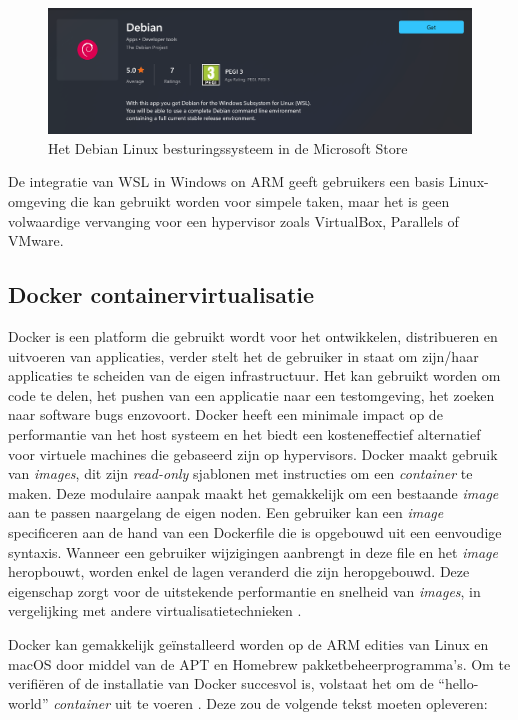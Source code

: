 \begin{figure}[!h]
	\centering
	\includegraphics[width=\linewidth]{img/debian.png}
	\caption{Het Debian Linux besturingssysteem in de Microsoft Store}
\end{figure}

De integratie van WSL in Windows on ARM geeft gebruikers een basis Linux-omgeving die kan gebruikt worden voor simpele taken, maar het is geen volwaardige vervanging voor een hypervisor zoals VirtualBox, Parallels of VMware.

\subsection{Docker containervirtualisatie}
Docker is een platform die gebruikt wordt voor het ontwikkelen, distribueren en uitvoeren van applicaties, verder stelt het de gebruiker in staat om zijn/haar applicaties te scheiden van de eigen infrastructuur. Het kan gebruikt worden om code te delen, het pushen van een applicatie naar een testomgeving, het zoeken naar software bugs enzovoort. Docker heeft een minimale impact op de performantie van het host systeem en het biedt een kosteneffectief alternatief voor virtuele machines die gebaseerd zijn op hypervisors. Docker maakt gebruik van \textit{images}, dit zijn \textit{read-only} sjablonen met instructies om een \textit{container} te maken. Deze modulaire aanpak maakt het gemakkelijk om een bestaande \textit{image} aan te passen naargelang de eigen noden. Een gebruiker kan een \textit{image} specificeren aan de hand van een Dockerfile die is opgebouwd uit een eenvoudige syntaxis. Wanneer een gebruiker wijzigingen aanbrengt in deze file en het \textit{image} heropbouwt, worden enkel de lagen veranderd die zijn heropgebouwd. Deze eigenschap zorgt voor de uitstekende performantie en snelheid van \textit{images}, in vergelijking met andere virtualisatietechnieken \autocite{Docker2020}.

Docker kan gemakkelijk geïnstalleerd worden op de ARM edities van Linux en macOS door middel van de APT en Homebrew pakketbeheerprogramma’s. Om te verifiëren of de installatie van Docker succesvol is, volstaat het om de “hello-world” \textit{container} uit te voeren \autocite{Andrews2019}. Deze zou de volgende tekst moeten opleveren:

